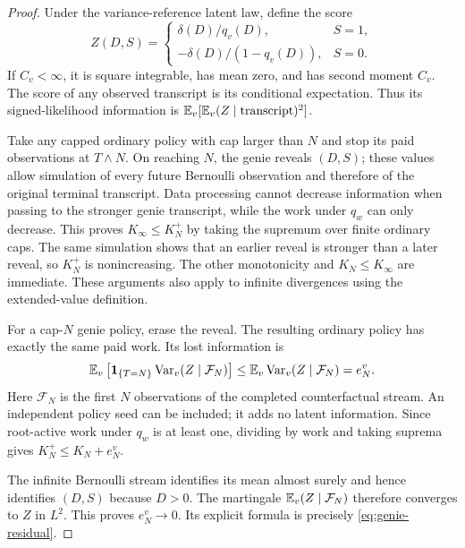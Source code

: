\begin{proof}
Under the variance-reference latent law, define the score
\[
 Z(D,S)=
 \begin{cases}
  \delta(D)/q_v(D),&S=1,\\
  -\delta(D)/(1-q_v(D)),&S=0.
 \end{cases}
\]
If $C_v<\infty$, it is square integrable, has mean zero, and has second
moment $C_v$. The score of any observed transcript is its conditional
expectation. Thus its signed-likelihood information is
$\mathbb E_v[\mathbb E_v(Z\mid\text{transcript})^2]$.

Take any capped ordinary policy with cap larger than $N$ and stop its paid
observations at $T\wedge N$. On reaching $N$, the genie reveals $(D,S)$;
these values allow simulation of every future Bernoulli observation and
therefore of the original terminal transcript. Data processing cannot
decrease information when passing to the stronger genie transcript, while
the work under $q_w$ can only decrease. This proves $K_\infty\le K_N^+$
by taking the supremum over finite ordinary caps. The same simulation
shows that an earlier reveal is stronger than a later reveal, so $K_N^+$
is nonincreasing. The other monotonicity and $K_N\le K_\infty$ are
immediate. These arguments also apply to infinite divergences using
the extended-value definition.

For a cap-$N$ genie policy, erase the reveal. The resulting ordinary policy
has exactly the same paid work. Its lost information is
\[
 \mathbb E_v\left[\mathbf1_{\{T=N\}}
                 \operatorname{Var}_v(Z\mid\mathcal F_N)\right]
 \le\mathbb E_v\operatorname{Var}_v(Z\mid\mathcal F_N)=e_N^v.
\]
Here $\mathcal F_N$ is the first $N$ observations of the completed
counterfactual stream. An independent policy seed can be included; it
adds no latent information. Since root-active work under $q_w$ is at
least one, dividing by work and taking suprema gives
$K_N^+\le K_N+e_N^v$.

The infinite Bernoulli stream identifies its mean almost surely and hence
identifies $(D,S)$ because $D>0$. The martingale
$\mathbb E_v(Z\mid\mathcal F_N)$ therefore converges to $Z$ in $L^2$.
This proves $e_N^v\to0$. Its explicit formula is precisely
\eqref{eq:genie-residual}.
\end{proof}

